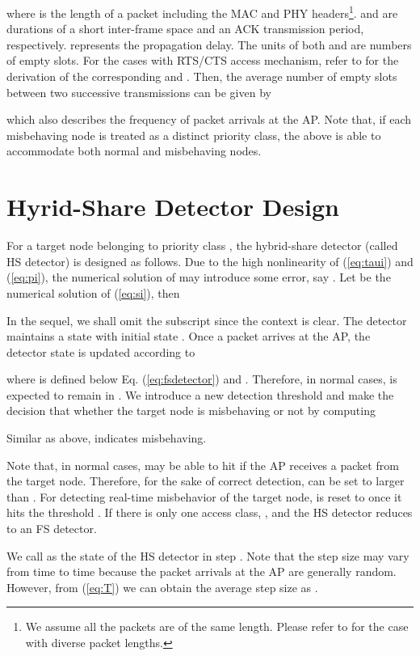 \documentclass[conference]{IEEEtran}
\begin{document}
where  is the length of a packet including the MAC and PHY headers\footnote{We assume all the packets are of the same length. Please refer to \cite{bianchi2000performance} for the case with diverse packet lengths.}.  and  are durations of a short inter-frame space and an ACK transmission period, respectively.  represents the propagation delay. The units of both  and  are numbers of empty slots. For the cases with RTS/CTS access mechanism, refer to \cite{kosek2011simple} for the derivation of the corresponding  and . Then, the average number of empty slots between two successive transmissions can be given by

which also describes the frequency of packet arrivals at the AP. Note that, if each misbehaving node is treated as a distinct priority class, the above is able to accommodate both normal and misbehaving nodes.





\section{Hyrid-Share Detector Design}\label{sec:hsdetector}


For a target node belonging to priority class , the hybrid-share detector (called HS detector) is designed as follows. Due to the high nonlinearity of (\ref{eq:taui}) and (\ref{eq:pi}), the numerical solution of  may introduce some error, say . Let  be the numerical solution of (\ref{eq:si}), then


In the sequel, we shall omit the subscript  since the context is clear. The detector maintains a state  with initial state . Once a packet arrives at the AP, the detector state is updated according to

where  is defined below Eq. (\ref{eq:fsdetector}) and . Therefore, in normal cases,  is expected to remain in . We introduce a new detection threshold  and make the decision that whether the target node is misbehaving or not by computing

Similar as above,  indicates misbehaving.

Note that, in normal cases,  may be able to hit  if the AP receives a packet from the target node. Therefore, for the sake of correct detection,  can be set to larger than . For detecting real-time misbehavior of the target node,  is reset to  once it hits the threshold . If there is only one access class, , and the HS detector reduces to an FS detector.

We call  as the state of the HS detector in step . Note that the step size may vary from time to time because the packet arrivals at the AP are generally random. However, from (\ref{eq:T}) we can obtain the average step size as .
\end{document}
